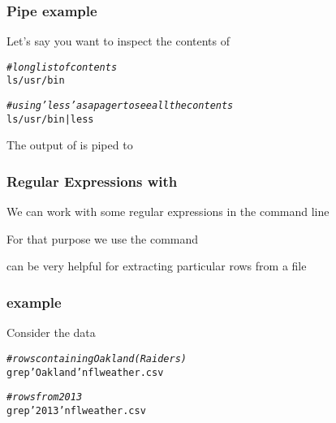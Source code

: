 \documentclass[12pt]{beamer}\usepackage[]{graphicx}\usepackage[]{color}
\makeatletter
\newcommand{\hlstr}[1]{\textcolor[rgb]{0.192,0.494,0.8}{#1}}%
\newcommand{\hlcom}[1]{\textcolor[rgb]{0.678,0.584,0.686}{\textit{#1}}}%
\newcommand{\hlopt}[1]{\textcolor[rgb]{0,0,0}{#1}}%
\newcommand{\hlstd}[1]{\textcolor[rgb]{0.345,0.345,0.345}{#1}}%
\newenvironment{kframe}{%
 \def\at@end@of@kframe{}%
 \ifinner\ifhmode%
  \def\at@end@of@kframe{\end{minipage}}%
  \begin{minipage}{\columnwidth}%
 \fi\fi%
 \def\FrameCommand##1{\hskip\@totalleftmargin \hskip-\fboxsep
 \colorbox{shadecolor}{##1}\hskip-\fboxsep
     \hskip-\linewidth \hskip-\@totalleftmargin \hskip\columnwidth}%
 \MakeFramed {\advance\hsize-\width
   \@totalleftmargin\z@ \linewidth\hsize
   \@setminipage}}%
 {\par\unskip\endMakeFramed%
 \at@end@of@kframe}
\newenvironment{knitrout}{}{} %
\makeatother
\begin{document}

\begin{frame}[fragile]
\frametitle{Pipe example}

Let's say you want to inspect the contents of 
\begin{knitrout}\footnotesize
{}\color{fgcolor}\begin{kframe}
\begin{alltt}
\hlcom{# long list of contents}
\hlstd{ls} \hlopt{/}\hlstd{usr}\hlopt{/}\hlstd{bin}

\hlcom{# using 'less' as a pager to see all the contents}
\hlstd{ls} \hlopt{/}\hlstd{usr}\hlopt{/}\hlstd{bin} \hlopt{|} \hlstd{less}
\end{alltt}
\end{kframe}
\end{knitrout}

The output of  is piped to 

\end{frame}


\begin{frame}
\begin{center}
\Huge{}
\end{center}
\end{frame}


\begin{frame}
\frametitle{Regular Expressions with }

\bbi
  \item We can work with some regular expressions in the command line
  \item For that purpose we use the command {\hilit {}}
  \item {} can be very helpful for extracting particular rows from a file
\ei

\end{frame}


\begin{frame}[fragile]
\frametitle{ example}

Consider the data 
\begin{knitrout}\footnotesize
{}\color{fgcolor}\begin{kframe}
\begin{alltt}
\hlcom{# rows containing Oakland (Raiders)}
grep \hlstr{'Oakland'} nflweather.csv

\hlcom{# rows from 2013}
grep \hlstr{'2013'} nflweather.csv
\end{alltt}
\end{kframe}
\end{knitrout}

\end{frame}
\end{document}
